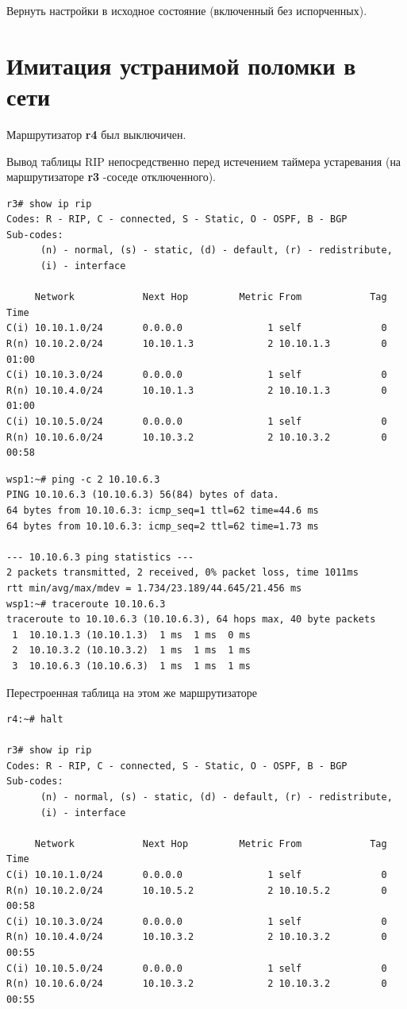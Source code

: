 \documentclass[a4paper,12pt]{article}
\begin{document}
Вернуть настройки в исходное состояние (включенный без испорченных).


\section{Имитация устранимой поломки в сети}

Маршрутизатор \textbf{r4} был выключичен.

Вывод таблицы RIP непосредственно перед истечением таймера устаревания (на маршрутизаторе \textbf{r3} -соседе отключенного).

\begin{Verbatim}
r3# show ip rip
Codes: R - RIP, C - connected, S - Static, O - OSPF, B - BGP
Sub-codes:
      (n) - normal, (s) - static, (d) - default, (r) - redistribute,
      (i) - interface

     Network            Next Hop         Metric From            Tag Time
C(i) 10.10.1.0/24       0.0.0.0               1 self              0
R(n) 10.10.2.0/24       10.10.1.3             2 10.10.1.3         0 01:00
C(i) 10.10.3.0/24       0.0.0.0               1 self              0
R(n) 10.10.4.0/24       10.10.1.3             2 10.10.1.3         0 01:00
C(i) 10.10.5.0/24       0.0.0.0               1 self              0
R(n) 10.10.6.0/24       10.10.3.2             2 10.10.3.2         0 00:58
\end{Verbatim}

\begin{Verbatim}
wsp1:~# ping -c 2 10.10.6.3
PING 10.10.6.3 (10.10.6.3) 56(84) bytes of data.
64 bytes from 10.10.6.3: icmp_seq=1 ttl=62 time=44.6 ms
64 bytes from 10.10.6.3: icmp_seq=2 ttl=62 time=1.73 ms

--- 10.10.6.3 ping statistics ---
2 packets transmitted, 2 received, 0% packet loss, time 1011ms
rtt min/avg/max/mdev = 1.734/23.189/44.645/21.456 ms
wsp1:~# traceroute 10.10.6.3
traceroute to 10.10.6.3 (10.10.6.3), 64 hops max, 40 byte packets
 1  10.10.1.3 (10.10.1.3)  1 ms  1 ms  0 ms
 2  10.10.3.2 (10.10.3.2)  1 ms  1 ms  1 ms
 3  10.10.6.3 (10.10.6.3)  1 ms  1 ms  1 ms
\end{Verbatim}

Перестроенная таблица на этом же маршрутизаторе

\begin{Verbatim}
r4:~# halt

r3# show ip rip
Codes: R - RIP, C - connected, S - Static, O - OSPF, B - BGP
Sub-codes:
      (n) - normal, (s) - static, (d) - default, (r) - redistribute,
      (i) - interface

     Network            Next Hop         Metric From            Tag Time
C(i) 10.10.1.0/24       0.0.0.0               1 self              0
R(n) 10.10.2.0/24       10.10.5.2             2 10.10.5.2         0 00:58
C(i) 10.10.3.0/24       0.0.0.0               1 self              0
R(n) 10.10.4.0/24       10.10.3.2             2 10.10.3.2         0 00:55
C(i) 10.10.5.0/24       0.0.0.0               1 self              0
R(n) 10.10.6.0/24       10.10.3.2             2 10.10.3.2         0 00:55
\end{Verbatim}
\end{document}
